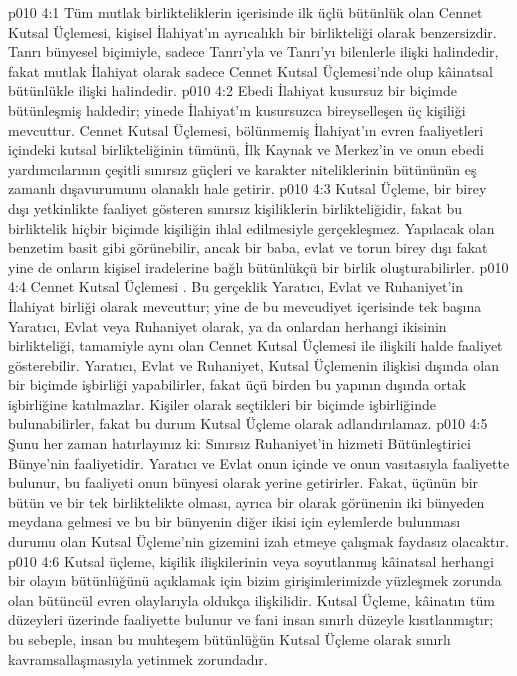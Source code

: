 \vs p010 4:1 Tüm mutlak birlikteliklerin içerisinde ilk üçlü bütünlük olan Cennet Kutsal Üçlemesi, kişisel İlahiyat’ın ayrıcalıklı bir birlikteliği olarak benzersizdir. Tanrı bünyesel biçimiyle, sadece Tanrı’yla ve Tanrı’yı bilenlerle ilişki halindedir, fakat mutlak İlahiyat olarak sadece Cennet Kutsal Üçlemesi’nde olup kâinatsal bütünlükle ilişki halindedir.
\vs p010 4:2 Ebedi İlahiyat kusursuz bir biçimde bütünleşmiş haldedir; yinede İlahiyat’ın kusursuzca bireyselleşen üç kişiliği mevcuttur. Cennet Kutsal Üçlemesi, bölünmemiş İlahiyat’ın evren faaliyetleri içindeki kutsal birlikteliğinin tümünü, İlk Kaynak ve Merkez’in ve onun ebedi yardımcılarının çeşitli sınırsız güçleri ve karakter niteliklerinin bütününün eş zamanlı dışavurumunu olanaklı hale getirir.
\vs p010 4:3 Kutsal Üçleme, bir birey dışı yetkinlikte faaliyet gösteren sınırsız kişiliklerin birlikteliğidir, fakat bu birliktelik hiçbir biçimde kişiliğin ihlal edilmesiyle gerçekleşmez. Yapılacak olan benzetim basit gibi görünebilir, ancak bir baba, evlat ve torun birey dışı fakat yine de onların kişisel iradelerine bağlı bütünlükçü bir birlik oluşturabilirler.
\vs p010 4:4 Cennet Kutsal Üçlemesi . Bu gerçeklik Yaratıcı, Evlat ve Ruhaniyet’in İlahiyat birliği olarak mevcuttur; yine de bu mevcudiyet içerisinde tek başına Yaratıcı, Evlat veya Ruhaniyet olarak, ya da onlardan herhangi ikisinin birlikteliği, tamamiyle aynı olan Cennet Kutsal Üçlemesi ile ilişkili halde faaliyet gösterebilir. Yaratıcı, Evlat ve Ruhaniyet, Kutsal Üçlemenin ilişkisi dışında olan bir biçimde işbirliği yapabilirler, fakat üçü birden bu yapının dışında ortak işbirliğine katılmazlar. Kişiler olarak seçtikleri bir biçimde işbirliğinde bulunabilirler, fakat bu durum Kutsal Üçleme olarak adlandırılamaz.
\vs p010 4:5 Şunu her zaman hatırlayınız ki: Sınırsız Ruhaniyet’in hizmeti Bütünleştirici Bünye’nin faaliyetidir. Yaratıcı ve Evlat onun içinde ve onun vasıtasıyla faaliyette bulunur, bu faaliyeti onun bünyesi olarak yerine getirirler. Fakat, üçünün bir bütün ve bir tek birliktelikte olması, ayrıca bir olarak görünenin iki bünyeden meydana gelmesi ve bu bir bünyenin diğer ikisi için eylemlerde bulunması durumu olan Kutsal Üçleme’nin gizemini izah etmeye çalışmak faydasız olacaktır.
\vs p010 4:6 Kutsal üçleme, kişilik ilişkilerinin veya soyutlanmış kâinatsal herhangi bir olayın bütünlüğünü açıklamak için bizim girişimlerimizde yüzleşmek zorunda olan bütüncül evren olaylarıyla oldukça ilişkilidir. Kutsal Üçleme, kâinatın tüm düzeyleri üzerinde faaliyette bulunur ve fani insan sınırlı düzeyle kısıtlanmıştır; bu sebeple, insan bu muhteşem bütünlüğün Kutsal Üçleme olarak sınırlı kavramsallaşmasıyla yetinmek zorundadır.
